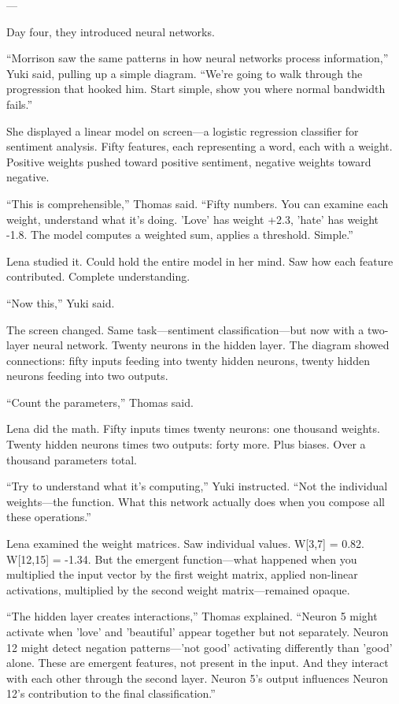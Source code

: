 ---

Day four, they introduced neural networks.

``Morrison saw the same patterns in how neural networks process information,'' Yuki said, pulling up a simple diagram. ``We're going to walk through the progression that hooked him. Start simple, show you where normal bandwidth fails.''

She displayed a linear model on screen—a logistic regression classifier for sentiment analysis. Fifty features, each representing a word, each with a weight. Positive weights pushed toward positive sentiment, negative weights toward negative.

``This is comprehensible,'' Thomas said. ``Fifty numbers. You can examine each weight, understand what it's doing. 'Love' has weight +2.3, 'hate' has weight -1.8. The model computes a weighted sum, applies a threshold. Simple.''

Lena studied it. Could hold the entire model in her mind. Saw how each feature contributed. Complete understanding.

``Now this,'' Yuki said.

The screen changed. Same task—sentiment classification—but now with a two-layer neural network. Twenty neurons in the hidden layer. The diagram showed connections: fifty inputs feeding into twenty hidden neurons, twenty hidden neurons feeding into two outputs.

``Count the parameters,'' Thomas said.

Lena did the math. Fifty inputs times twenty neurons: one thousand weights. Twenty hidden neurons times two outputs: forty more. Plus biases. Over a thousand parameters total.

``Try to understand what it's computing,'' Yuki instructed. ``Not the individual weights—the function. What this network actually does when you compose all these operations.''

Lena examined the weight matrices. Saw individual values. W[3,7] = 0.82. W[12,15] = -1.34. But the emergent function—what happened when you multiplied the input vector by the first weight matrix, applied non-linear activations, multiplied by the second weight matrix—remained opaque.

``The hidden layer creates interactions,'' Thomas explained. ``Neuron 5 might activate when 'love' and 'beautiful' appear together but not separately. Neuron 12 might detect negation patterns—'not good' activating differently than 'good' alone. These are emergent features, not present in the input. And they interact with each other through the second layer. Neuron 5's output influences Neuron 12's contribution to the final classification.''

